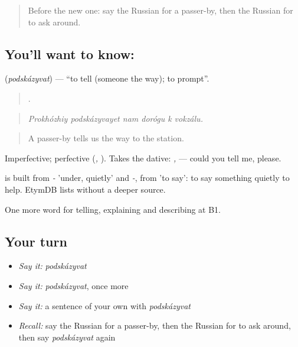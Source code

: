 \label{lesson:RU-C441-podskazyvat}



\begin{quote}
Before the new one: say the Russian for a passer-by, then the Russian for to ask around.
\end{quote}

\subsection*{You'll want to know: }
\textbf{} (\emph{podskázyvat}) — \textquotedblleft{}to tell (someone the way); to prompt\textquotedblright{}.

\begin{quote}
     .
\end{quote}

\begin{quote}
\emph{Prokhózhiy podskázyvayet nam dorógu k vokzálu.}
\end{quote}

\begin{quote}
A passer-by tells us the way to the station.
\end{quote}

Imperfective; perfective \emph{} (\emph{, }). Takes the dative: \emph{, } — could you tell me, please.

\begin{cousinweb}
\emph{} is built from \emph{-} 'under, quietly' and \emph{-}, from \emph{} 'to say': to say something quietly to help. EtymDB lists \emph{} without a deeper source.
\end{cousinweb}

\begin{grammarlens}[title={What you've built}]
One more word for telling, explaining and describing at B1.
\end{grammarlens}

\subsection*{Your turn}
\begin{itemize}
\raggedright
  \item \emph{Say it:} \emph{podskázyvat}
  \item \emph{Say it:} \emph{podskázyvat}, once more
  \item \emph{Say it:} a sentence of your own with \emph{podskázyvat}
  \item \emph{Recall:} say the Russian for a passer-by, then the Russian for to ask around, then say \emph{podskázyvat} again
\end{itemize}

